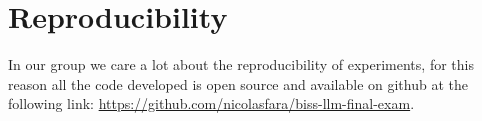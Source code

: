 \documentclass[11pt]{article}
\begin{document}
\section{Reproducibility}
In our group we care a lot about the reproducibility of experiments, for this reason all the code developed is 
open source and available on github at the following link: \url{https://github.com/nicolasfara/biss-llm-final-exam}.





\end{document}
